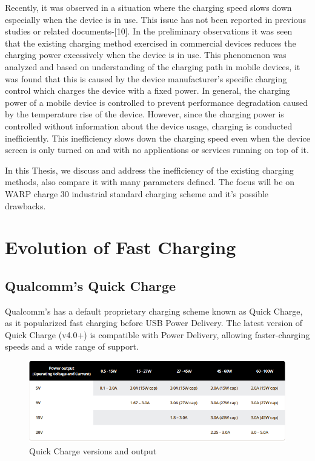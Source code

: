 \documentclass[conference]{IEEEtran}
\begin{document}
Recently, it was observed in a situation where the charging speed slows down especially when the device is in use. This issue has not been reported in previous studies or related documents\cite{b7}-[10]. In the preliminary observations it was seen that the existing charging method exercised in commercial devices reduces the charging power excessively when the device is in use. This phenomenon was analyzed and based on understanding of the charging path in mobile devices, it was found that this is caused by the device manufacturer’s specific charging control which charges the device with a fixed power. In general, the charging power of a mobile device is controlled to prevent performance degradation caused by the temperature rise of the device\cite{b11,b12}. However, since the charging power is controlled without information about the device usage, charging is conducted inefficiently. This inefficiency slows down the charging speed even when the device screen is only turned on and with no applications or services running on top of it.     

In this Thesis, we discuss and address the inefficiency of the existing charging methods, also compare it with many parameters defined. The focus will be on WARP charge 30 industrial standard charging scheme and it's possible drawbacks.   

\section{Evolution of Fast Charging}

\subsection{Qualcomm's Quick Charge}

Qualcomm’s has a default proprietary charging scheme known as Quick Charge, as it popularized fast charging before USB Power Delivery. The latest version of Quick Charge (v4.0+) is compatible with Power Delivery, allowing faster-charging speeds and a wide range of support. 

\begin{figure}[h!]
  \includegraphics[width=\linewidth]{images/image1.png}
  \caption{Quick Charge versions and output\cite{b13}}
\end{figure}
\end{document}
